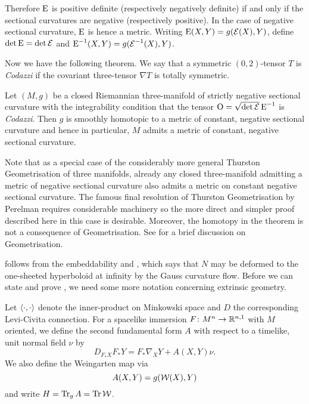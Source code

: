 \documentclass[a4paper,12pt]{amsart}
\begin{document}
Therefore \(\operatorname{E}\) is positive definite (respectively negatively definite) if and only if the sectional curvatures are negative (respectively positive). In the case of negative sectional curvature, \(\operatorname{E}\) is hence a metric. Writing \(\operatorname{E}(X, Y) = g(\operatorname{\mathcal{E}}(X), Y)\), define \(\det \operatorname{E} = \det \operatorname{\mathcal{E}}\) and \(\operatorname{E}^{-1}(X, Y) = g(\operatorname{\mathcal{E}}^{-1} (X), Y)\).

Now we have the following theorem. We say that a symmetric \((0,2)\)-tensor \(T\) is \emph{Codazzi} if the covariant three-tensor \(\nabla T\) is totally symmetric.

\begin{thm}
\label{thm:intg_const_curv}

Let \((M, g)\) be a closed Riemannian three-manifold of strictly negative sectional curvature with the integrability condition that the tensor \(\operatorname{O} = \sqrt{\det \operatorname{\mathcal{E}}} \operatorname{E}^{-1}\) is \emph{Codazzi}. Then \(g\) is smoothly homotopic to a metric of constant, negative sectional curvature and hence in particular, \(M\) admits a metric of constant, negative sectional curvature.
\end{thm}

Note that as a special case of the considerably more general Thurston Geometrisation of three manifolds, already any closed three-manifold admitting a metric of negative sectional curvature also admits a metric on constant negative sectional curvature. The famous final resolution of Thurston Geometrisation by Perelman requires considerable machinery so the more direct and simpler proof described here in this case is desirable. Moreover, the homotopy in the theorem is not a consequence of Geometrisation. See  for a brief discussion on Geometrisation.

 follows from the embeddability  and \cite[Theorem 1.1]{MR3344442}, which says that \(N\) may be deformed to the one-sheeted hyperboloid at infinity by the Gauss curvature flow.
Before we can state and prove , we need some more notation concerning extrinsic geometry.

Let \(\left\langle \cdot,\cdot \right\rangle\) denote the inner-product on Minkowski space and \(D\) the corresponding Levi-Civita connection. For a spacelike immersion \(F\colon M^n \to \mathbb{R}^{n,1}\) with \(M\) oriented, we define the second fundamental form $A$ with respect to a timelike, unit normal field $\nu$ by
\[
D_{F_{\ast} X} F_{\ast} Y = F_{\ast} \nabla_X Y + A(X,Y)\nu.
\]
We also define the Weingarten map via
\[
A(X, Y) =  g(\operatorname{\mathcal{W}}(X), Y)
\] 
and write $H = \operatorname{Tr}_{g}A = \operatorname{Tr} \operatorname{\mathcal{W}}$.
\end{document}
